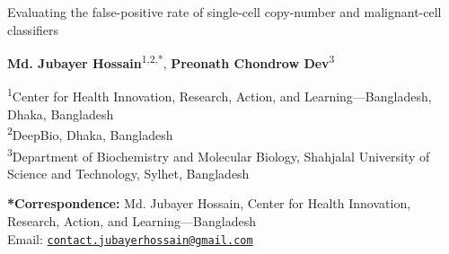 \documentclass[11pt,letterpaper]{article}
\begin{document}

\begin{flushleft}
  {\LARGE\bfseries\raggedright Evaluating the false-positive rate of single-cell copy-number and malignant-cell classifiers\par}
  \vspace{0.8em}
  {\large\textbf{Md. Jubayer Hossain}\textsuperscript{1,2,*}, \textbf{Preonath Chondrow Dev}\textsuperscript{3}\par}
  \vspace{0.5em}
  {\small
  \textsuperscript{1}Center for Health Innovation, Research, Action, and Learning---Bangladesh, Dhaka, Bangladesh\\
  \textsuperscript{2}DeepBio, Dhaka, Bangladesh\\
  \textsuperscript{3}Department of Biochemistry and Molecular Biology, Shahjalal University of Science and Technology, Sylhet, Bangladesh\par
  }
  \vspace{0.4em}
  {\footnotesize\textbf{*Correspondence:} Md. Jubayer Hossain, Center for Health Innovation, Research, Action, and Learning---Bangladesh\\
  Email: \href{mailto:contact.jubayerhossain@gmail.com}{\texttt{contact.jubayerhossain@gmail.com}}\par}
\end{flushleft}

\vspace{0.8em}

\begingroup
\small
{}
\vspace{0.4em}
\end{document}
